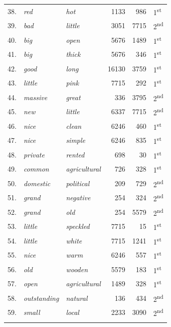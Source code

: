\begin{table}
{\begin{tabular}[t]{rllrrl}
38. & \textit{red} & \textit{hot} & \num{1133} & \num{986} & 1\textsuperscript{st} \\
39. & \textit{bad} & \textit{little} & \num{3051} & \num{7715} & 2\textsuperscript{nd} \\
40. & \textit{big} & \textit{open} & \num{5676} & \num{1489} & 1\textsuperscript{st} \\
41. & \textit{big} & \textit{thick} & \num{5676} & \num{346} & 1\textsuperscript{st} \\
42. & \textit{good} & \textit{long} & \num{16130} & \num{3759} & 1\textsuperscript{st} \\
43. & \textit{little} & \textit{pink} & \num{7715} & \num{292} & 1\textsuperscript{st} \\
44. & \textit{massive} & \textit{great} & \num{336} & \num{3795} & 2\textsuperscript{nd} \\
45. & \textit{new} & \textit{little} & \num{6337} & \num{7715} & 2\textsuperscript{nd} \\
46. & \textit{nice} & \textit{clean} & \num{6246} & \num{460} & 1\textsuperscript{st} \\
47. & \textit{nice} & \textit{simple} & \num{6246} & \num{835} & 1\textsuperscript{st} \\
48. & \textit{private} & \textit{rented} & \num{698} & \num{30} & 1\textsuperscript{st} \\
49. & \textit{common} & \textit{agricultural} & \num{726} & \num{328} & 1\textsuperscript{st} \\
50. & \textit{domestic} & \textit{political} & \num{209} & \num{729} & 2\textsuperscript{nd} \\
51. & \textit{grand} & \textit{negative} & \num{254} & \num{324} & 2\textsuperscript{nd} \\
52. & \textit{grand} & \textit{old} & \num{254} & \num{5579} & 2\textsuperscript{nd} \\
53. & \textit{little} & \textit{speckled} & \num{7715} & \num{15} & 1\textsuperscript{st} \\
54. & \textit{little} & \textit{white} & \num{7715} & \num{1241} & 1\textsuperscript{st} \\
55. & \textit{nice} & \textit{warm} & \num{6246} & \num{557} & 1\textsuperscript{st} \\
56. & \textit{old} & \textit{wooden} & \num{5579} & \num{183} & 1\textsuperscript{st} \\
57. & \textit{open} & \textit{agricultural} & \num{1489} & \num{328} & 1\textsuperscript{st} \\
58. & \textit{outstanding} & \textit{natural} & \num{136} & \num{434} & 2\textsuperscript{nd} \\
59. & \textit{small} & \textit{local} & \num{2233} & \num{3090} & 2\textsuperscript{nd} \\
\lspbottomrule
\end{tabular}}
\end{table}

